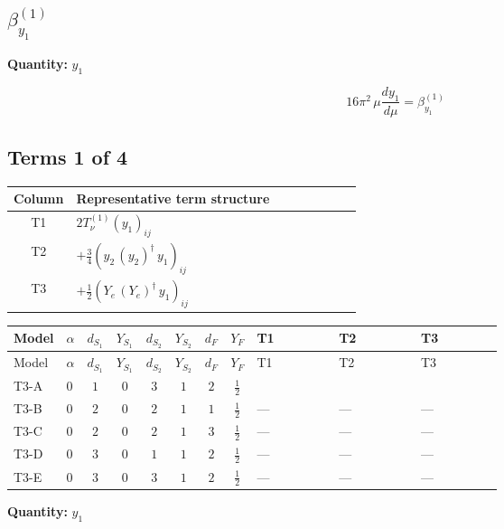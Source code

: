 \documentclass[8pt]{article}
\begin{document}
\begin{landscape}
\section*{$\beta_{y_1}^{(1)}$}
\noindent\textbf{Quantity: }$y_1$\par\smallskip
\[16\pi^2\,\mu\frac{d y_1}{d\mu}=\beta_{y_1}^{(1)}\]
\subsection*{Terms 1 of 4}
\begin{center}
\begin{tabular}{@{}c >{\raggedright\arraybackslash}p{0.82\linewidth}@{}}
\toprule
Column & Representative term structure \\
\midrule
T1 & \(\displaystyle 2 T_{\nu}^{(1)} \left({y_1}\right)_{ij}\) \\
\midrule
T2 & \(\displaystyle +\frac{3}{4} \left({y_2}\,\left({y_2}\right)^{\dagger}\,{y_1}\right)_{ij}\) \\
\midrule
T3 & \(\displaystyle +\frac{1}{2} \left({Y_e}\,\left({Y_e}\right)^{\dagger}\,{y_1}\right)_{ij}\) \\
\midrule
\bottomrule
\end{tabular}
\end{center}
\smallskip
\tiny
\begin{longtable}{@{}llcccccc >{\raggedright\arraybackslash}p{0.21\linewidth} >{\raggedright\arraybackslash}p{0.21\linewidth} >{\raggedright\arraybackslash}p{0.21\linewidth}@{}}
\toprule
Model & $\alpha$ & $d_{S_1}$ & $Y_{S_1}$ & $d_{S_2}$ & $Y_{S_2}$ & $d_F$ & $Y_F$ & T1 & T2 & T3 \\
\midrule
\endfirsthead
\toprule
Model & $\alpha$ & $d_{S_1}$ & $Y_{S_1}$ & $d_{S_2}$ & $Y_{S_2}$ & $d_F$ & $Y_F$ & T1 & T2 & T3 \\
\midrule
\endhead
T3-A & $0$ & $1$ & $0$ & $3$ & $1$ & $2$ & $\frac{1}{2}$ & \scriptsize\adjustbox{max width=\linewidth}{$\begin{gathered} 2 T_{\nu}^{(1)} \left({y_1}\right)_{ij}\end{gathered}$} & \scriptsize\adjustbox{max width=\linewidth}{$\begin{gathered} +\frac{3}{4} \left({y_2}\,\left({y_2}\right)^{\dagger}\,{y_1}\right)_{ij}\end{gathered}$} & \scriptsize\adjustbox{max width=\linewidth}{$\begin{gathered} +\frac{1}{2} \left({Y_e}\,\left({Y_e}\right)^{\dagger}\,{y_1}\right)_{ij}\end{gathered}$} \\
\midrule
T3-B & $0$ & $2$ & $0$ & $2$ & $1$ & $1$ & $\frac{1}{2}$ & --- & --- & --- \\
\midrule
T3-C & $0$ & $2$ & $0$ & $2$ & $1$ & $3$ & $\frac{1}{2}$ & --- & --- & --- \\
\midrule
T3-D & $0$ & $3$ & $0$ & $1$ & $1$ & $2$ & $\frac{1}{2}$ & --- & --- & --- \\
\midrule
T3-E & $0$ & $3$ & $0$ & $3$ & $1$ & $2$ & $\frac{1}{2}$ & --- & --- & --- \\
\midrule
\bottomrule
\end{longtable}
\clearpage
\noindent\textbf{Quantity: }$y_1$\par\smallskip

\end{landscape}
\end{document}

